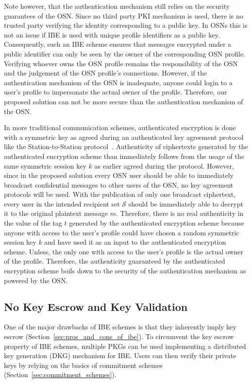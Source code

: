 Note however, that the authentication mechanism still relies on the security guarantees of the OSN. Since no third party PKI mechanism is used, there is no trusted party verifying the identity corresponding to a public key. In OSNs this is not an issue if IBE is used with unique profile identifiers as a public key. Consequently, such an IBE scheme ensures that messages encrypted under a public identifier can only be seen by the owner of the corresponding OSN profile. Verifying whoever owns the OSN profile remains the responsibility of the OSN and the judgement of the OSN profile's connections. However, if the authentication mechanism of the OSN is inadequate, anyone could login to a user's profile to impersonate the actual owner of the profile. Therefore, our proposed solution can not be more secure than the authentication mechanism of the OSN.

In more traditional communication schemes, authenticated encryption is done with a symmetric key as agreed during an authenticated key agreement protocol like the Station-to-Station protocol~\cite{art:DiffieOW92}. Authenticity of ciphertexts generated by the authenticated encryption scheme than immediately follows from the usage of the same symmetric session key $k$ as earlier agreed during the protocol. However, since in the proposed solution every OSN user should be able to immediately broadcast confidential messages to other users of the OSN, no key agreement protocols will be used. With the publication of only one broadcast ciphertext, every user in the intended recipient set $\mathcal{S}$ should be immediately able to decrypt it to the original plaintext message $m$. Therefore, there is no real authenticity in the value of the tag $t$ generated by the authenticated encryption scheme because anyone with access to the user's profile could have chosen a random symmetric session key $k$ and have used it as an input to the authenticated encryption scheme. Unless, the only one with access to the user's profile is the actual owner of the profile. Therefore, the authenticity guaranteed by the authenticated encryption scheme boils down to the security of the authentication mechanism as powered by the OSN.


\subsection{No Key Escrow and Key Validation}
One of the major drawbacks of IBE schemes is that they inherently imply key escrow (Section~\ref{sec:pros_and_cons_of_ibe}). To circumvent the key escrow property of IBE schemes, multiple PKGs can be used implementing a distributed key generation (DKG) mechanism for IBE. Users can then verify their private keys by relying on the basics of commitment schemes (Section~\ref{sec:commitment_schemes}).

